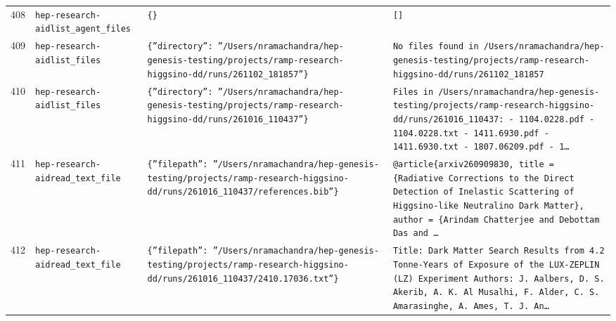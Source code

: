 \documentclass[11pt,a4paper]{article}
\begin{document}
\begin{longtable}{@{}p{}p{}p{}p{}@{}}
408 & \texttt{hep-research-aid}\newline\texttt{list\_\allowbreak{}agent\_\allowbreak{}files} & \texttt{\{\}\allowbreak{}} & \texttt{[]\allowbreak{}} \\
409 & \texttt{hep-research-aid}\newline\texttt{list\_\allowbreak{}files} & \texttt{\{''directory'':\allowbreak{} ''/\allowbreak{}Users/\allowbreak{}nramachandra/\allowbreak{}hep-genesis-testing/\allowbreak{}projects/\allowbreak{}ramp-research-higgsino-dd/\allowbreak{}runs/\allowbreak{}261102\_\allowbreak{}181857''\}\allowbreak{}} & \texttt{No files found in /\allowbreak{}Users/\allowbreak{}nramachandra/\allowbreak{}hep-genesis-testing/\allowbreak{}projects/\allowbreak{}ramp-research-higgsino-dd/\allowbreak{}runs/\allowbreak{}261102\_\allowbreak{}181857} \\
410 & \texttt{hep-research-aid}\newline\texttt{list\_\allowbreak{}files} & \texttt{\{''directory'':\allowbreak{} ''/\allowbreak{}Users/\allowbreak{}nramachandra/\allowbreak{}hep-genesis-testing/\allowbreak{}projects/\allowbreak{}ramp-research-higgsino-dd/\allowbreak{}runs/\allowbreak{}261016\_\allowbreak{}110437''\}\allowbreak{}} & \texttt{Files in /\allowbreak{}Users/\allowbreak{}nramachandra/\allowbreak{}hep-genesis-testing/\allowbreak{}projects/\allowbreak{}ramp-research-higgsino-dd/\allowbreak{}runs/\allowbreak{}261016\_\allowbreak{}110437:\allowbreak{}   - 1104.0228.pdf   - 1104.0228.txt   - 1411.6930.pdf   - 1411.6930.txt   - 1807.06209.pdf   - 1\ldots{}\allowbreak{}} \\
411 & \texttt{hep-research-aid}\newline\texttt{read\_\allowbreak{}text\_\allowbreak{}file} & \texttt{\{''filepath'':\allowbreak{} ''/\allowbreak{}Users/\allowbreak{}nramachandra/\allowbreak{}hep-genesis-testing/\allowbreak{}projects/\allowbreak{}ramp-research-higgsino-dd/\allowbreak{}runs/\allowbreak{}261016\_\allowbreak{}110437/\allowbreak{}references.bib''\}\allowbreak{}} & \texttt{@article\{arxiv260909830,\allowbreak{}   title =\allowbreak{} \{Radiative Corrections to the Direct Detection of Inelastic Scattering of Higgsino-like Neutralino Dark Matter\}\allowbreak{},\allowbreak{}   author =\allowbreak{} \{Arindam Chatterjee and Debottam Das and \ldots{}\allowbreak{}} \\
412 & \texttt{hep-research-aid}\newline\texttt{read\_\allowbreak{}text\_\allowbreak{}file} & \texttt{\{''filepath'':\allowbreak{} ''/\allowbreak{}Users/\allowbreak{}nramachandra/\allowbreak{}hep-genesis-testing/\allowbreak{}projects/\allowbreak{}ramp-research-higgsino-dd/\allowbreak{}runs/\allowbreak{}261016\_\allowbreak{}110437/\allowbreak{}2410.17036.txt''\}\allowbreak{}} & \texttt{Title:\allowbreak{} Dark Matter Search Results from 4.2 Tonne-Years of Exposure of the LUX-ZEPLIN (LZ)\allowbreak{} Experiment Authors:\allowbreak{} J. Aalbers,\allowbreak{} D. S. Akerib,\allowbreak{} A. K. Al Musalhi,\allowbreak{} F. Alder,\allowbreak{} C. S. Amarasinghe,\allowbreak{} A. Ames,\allowbreak{} T. J. An\ldots{}\allowbreak{}} \\

\end{longtable}
\end{document}
